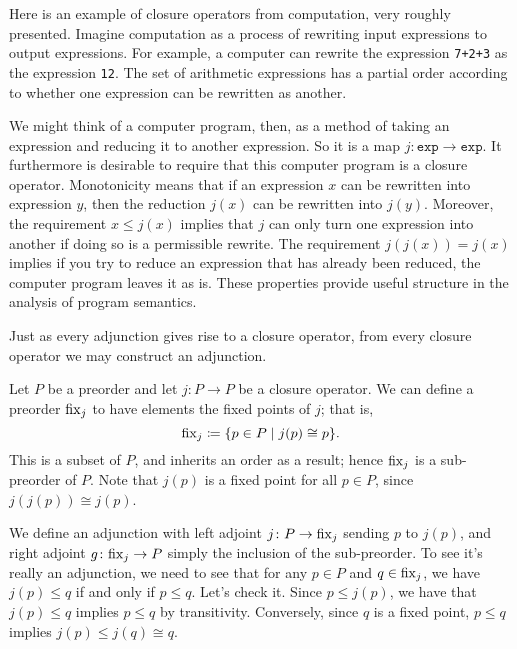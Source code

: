 \documentclass[7Sketches]{subfiles}
\begin{document}
\begin{example}%
\label{ex.rewrite_systems}%
Here is an example of closure operators from computation, very roughly presented. Imagine computation as a
process of rewriting input expressions to output expressions. For example, a computer
can rewrite the expression \texttt{7+2+3} as the expression \texttt{12}. The set of arithmetic expressions
has a partial order according to whether one expression can be rewritten as another.

We might think of a computer program, then, as a method of taking an expression and reducing it to
another expression. So it is a map $j\colon \texttt{exp} \to \texttt{exp}$.
It furthermore is desirable to require that this computer program is a closure
operator. Monotonicity means that if an expression $x$ can be rewritten into expression
$y$, then the reduction $j(x)$ can be rewritten into $j(y)$. Moreover, the requirement $x \le j(x)$ implies that $j$
can only turn one expression into another if doing so is a permissible rewrite. The requirement
$j(j(x))=j(x)$ implies if you try to reduce an expression that has already been reduced,
the computer program leaves it as is. These properties provide useful structure
in the analysis of program semantics.
\end{example}

\begin{example}%
Just as every adjunction gives rise to a closure operator, from every closure
operator we may construct an adjunction.

Let $P$ be a preorder and let
$j\colon P\to P$ be a closure operator. We can define a preorder $\mathrm{fix}_j$ to have
elements the fixed points of $j$; that is,
\[
\mathrm{fix}_j\coloneqq\{p \in P\mid j(p)\cong p\}.
\]
This is a subset of $P$, and inherits an order as a result; hence $\mathrm{fix}_j$ is a sub-preorder of $P$. Note that $j(p)$ is a fixed point for all $p\in P$, since $j(j(p))\cong j(p)$.

We define an adjunction with left adjoint $j\colon P \to
\mathrm{fix}_j$ sending $p$ to $j(p)$, and right adjoint $g\colon \mathrm{fix}_j
\to P$ simply the inclusion of the sub-preorder. To see it's really an adjunction, we need to see that for any $p \in P$ and $q \in \mathrm{fix}_j$, we have $j(p) \le q$ if and only if $p \le q$. Let's check it. Since $p \le j(p)$, we have that $j(p) \le q$ implies $p \le q$ by transitivity.
Conversely, since $q$ is a fixed point, $p \le q$ implies $j(p) \le j(q)\cong q$.
\end{example}
\end{document}
